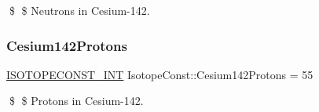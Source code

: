\$ \$ Neutrons in Cesium-\/142. \mbox{\label{group___isotope_const-_cesium-_cs142_gae4777c21348c4d0babbb7c4fd0a91423}} 
\subsubsection{\texorpdfstring{Cesium142\+Protons}{Cesium142Protons}}
{\footnotesize\ttfamily \mbox{\hyperlink{group___isotope_const-_macros_ga5f18360b3e99483a35c32d789e62621c}{I\+S\+O\+T\+O\+P\+E\+C\+O\+N\+S\+T\+\_\+\+I\+NT}} Isotope\+Const\+::\+Cesium142\+Protons = 55}

\$ \$ Protons in Cesium-\/142. 